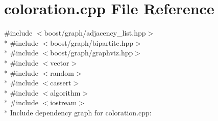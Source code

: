\section{coloration.\+cpp File Reference}
\label{coloration_8cpp}
{\ttfamily \#include $<$boost/graph/adjacency\+\_\+list.\+hpp$>$}\\*
{\ttfamily \#include $<$boost/graph/bipartite.\+hpp$>$}\\*
{\ttfamily \#include $<$boost/graph/graphviz.\+hpp$>$}\\*
{\ttfamily \#include $<$vector$>$}\\*
{\ttfamily \#include $<$random$>$}\\*
{\ttfamily \#include $<$cassert$>$}\\*
{\ttfamily \#include $<$algorithm$>$}\\*
{\ttfamily \#include $<$iostream$>$}\\*
Include dependency graph for coloration.\+cpp\+:
